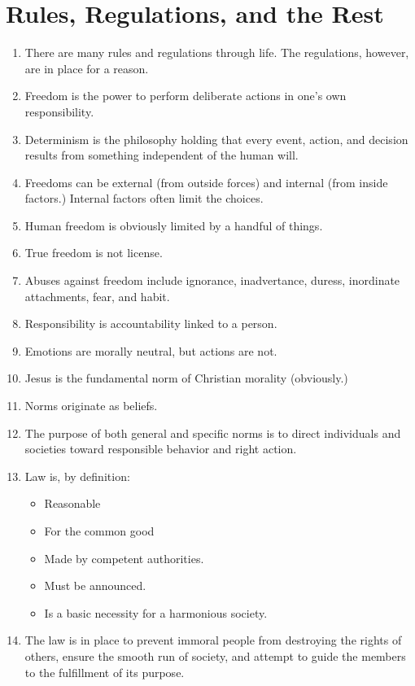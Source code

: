 \documentclass[10pt]{article}
\begin{document}
\section{Rules, Regulations, and the Rest}
\begin{enumerate}
	\item There are many rules and regulations through life.  The regulations, 
		however, are in place for a reason.
	\item Freedom is the power to perform deliberate actions in one's own
		responsibility.
	\item Determinism is the philosophy holding that every event, action, and 
		decision results from something independent of the human will.
	\item Freedoms can be external (from outside forces) and internal (from 
		inside factors.)  Internal factors often limit the choices.
	\item Human freedom is obviously limited by a handful of things.
	\item True freedom is not license.
	\item Abuses against freedom include ignorance, inadvertance, duress, 
		inordinate attachments, fear, and habit.
	\item Responsibility is accountability linked to a person.  
	\item Emotions are morally neutral, but actions are not.  
	\item Jesus is the fundamental norm of Christian morality (obviously.)  
	\item Norms originate as beliefs.  
	\item The purpose of both general and specific norms is to direct 
		individuals and societies toward responsible behavior and right 
		action.
	\item Law is, by definition:
		\begin{itemize}
			\item Reasonable
			\item For the common good
			\item Made by competent authorities.
			\item Must be announced.
			\item Is a basic necessity for a harmonious society.
			\end{itemize}
	\item The law is in place to prevent immoral people from destroying the 
		rights of others, ensure the smooth run of society, and attempt to 
		guide the members to the fulfillment of its purpose.

\end{enumerate}
\end{document}
